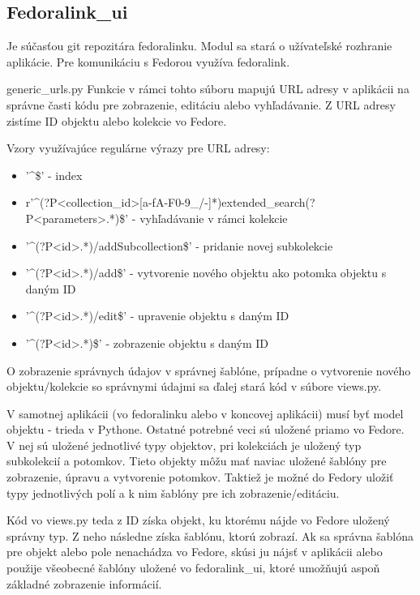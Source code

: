 \documentclass[thesis=M,slovak]{FITthesis}[2013/05/06]
\begin{document}
\subsection{Fedoralink\_ui}
Je súčasťou git repozitára fedoralinku. Modul sa stará o užívateľské rozhranie aplikácie. Pre komunikáciu s Fedorou využíva fedoralink.

generic\_urls.py
Funkcie v rámci tohto súboru mapujú URL adresy v aplikácii na správne časti kódu pre zobrazenie, editáciu alebo vyhľadávanie. Z URL adresy zistíme ID objektu alebo kolekcie vo Fedore.

Vzory využívajúce regulárne výrazy pre URL adresy:
\begin{itemize}
	\item '\textasciicircum\$' - index
	\item r'\textasciicircum(?P<collection\_id>[a-fA-F0-9\_/-]*)extended\_search(?P<parameters>.*)\$' - vyhľadávanie v rámci kolekcie
	\item '\textasciicircum(?P<id>.*)/addSubcollection\$' - pridanie novej subkolekcie
	\item '\textasciicircum(?P<id>.*)/add\$' - vytvorenie nového objektu ako potomka objektu s daným ID
	\item '\textasciicircum(?P<id>.*)/edit\$' - upravenie objektu s daným ID
	\item '\textasciicircum(?P<id>.*)\$' - zobrazenie objektu s daným ID
\end{itemize}

O zobrazenie správnych údajov v správnej šablóne, prípadne o vytvorenie nového objektu/kolekcie so správnymi údajmi sa ďalej stará kód v súbore views.py.

V samotnej aplikácii (vo fedoralinku alebo v koncovej aplikácii) musí byť model objektu - trieda v Pythone. Ostatné potrebné veci sú uložené priamo vo Fedore. V nej sú uložené jednotlivé typy objektov, pri kolekciách je uložený typ subkolekcií a potomkov. Tieto objekty môžu mať naviac uložené šablóny pre zobrazenie, úpravu a vytvorenie potomkov. Taktiež je možné do Fedory uložiť typy jednotlivých polí a k nim šablóny pre ich zobrazenie/editáciu.

Kód vo views.py teda z ID získa objekt, ku ktorému nájde vo Fedore uložený správny typ. Z neho následne získa šablónu, ktorú zobrazí. Ak sa správna šablóna pre objekt alebo pole nenachádza vo Fedore, skúsi ju nájsť v aplikácii alebo použije všeobecné šablóny uložené vo fedoralink\_ui, ktoré umožňujú aspoň základné zobrazenie informácií.
\end{document}
